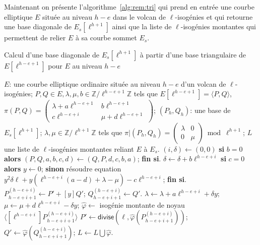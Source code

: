 \documentclass[10pt,a4paper]{book}
\theoremstyle{plain}
\theoremstyle{definition}
\theoremstyle{definition}
\theoremstyle{definition}
\theoremstyle{definition}
\theoremstyle{remark}
\theoremstyle{remark}
\theoremstyle{definition}
\begin{document}
Maintenant on présente l'algorithme~\ref{alg:rem:tri} qui prend en entrée une 
courbe elliptique $E$ située au niveau $h-e$ dans le volcan de 
$\ell$-isogénies et qui retourne une base diagonale de $E_s[\ell^{h+1}]$ ainsi 
que la liste de $\ell$-isogénies montantes qui permettent de relier $E$ à sa 
courbe sommet $E_s$.

\begin{algorithm}
\caption{\label{alg:rem:tri}Calcul d'une base diagonale de $E_s[\ell^{h+1}]$ à 
partir d'une base triangulaire de $E[\ell^{h-e+1}]$ pour $E$ au niveau
$h-e$}
\begin{algorithmic}[1]
\REQUIRE $E$: une courbe elliptique ordinaire située au niveau $h-e$ d'un 
volcan de $\ell$-isogénies; $P,Q \in E, \lambda, \mu, b \in \mathbb{Z}/
\ell^{h-e+1}\mathbb{Z}$ tels que $E[\ell^{h-e+1}]=\langle P,Q \rangle$, $\pi(P,Q)
=\left( \begin{smallmatrix}
\lambda + a \ell^{h-e+1}  & b \ell^{h-e+1} \\
c\ell^{h-e+i} & \mu + d \ell^{h-e+1}  \end{smallmatrix} \right)$;
\ENSURE $(P_h, Q_h)$: une base de $E_s[\ell^{h+1}]$;
$\lambda, \mu \in \mathbb{Z}/\ell^{h+1} \mathbb{Z}$
tels que $\pi|(P_h,Q_h)= \left( \begin{smallmatrix}
\lambda  & 0\\
0 & \mu  \end{smallmatrix} \right) \bmod {\ell^{h+1}}$; $L$ une liste de 
$\ell$-isogénies montantes reliant $E$ à $E_s$.
\STATE $(i,\delta) \leftarrow (0,0)$
\STATE \textbf{si} $b = 0$ \textbf{alors} $(P,Q,a,b,c,d) \leftarrow (Q,P,d,c,b,a)$; \textbf{fin si}.
 \label{alg:rem:tri:trigonal:debut} %
\STATE $\delta \leftarrow \delta + b \ell^{h-e+i}$
\STATE \textbf{si} $c = 0$ \textbf{alors} $y \leftarrow 0$;
\STATE\label{alg:rem:tri:trigonal:solve1} \textbf{sinon}  résoudre equation 
 $ y^2 \delta \ell + y (\ell^{h-e+i}(a-d)+\lambda - \mu) - c\ell^{h-e+i} $; \textbf{fin  si}.
\STATE\label{alg:rem:tri:trigonal:upd-P}
  $P_{h-e+i+1}^{(h-e+i)} \leftarrow P' + [y] Q'$; $Q_{h-e+i+1}^{(h-e+i)} \leftarrow Q'$.
\STATE $\lambda \leftarrow \lambda + a \ell^{h-e+i} + \delta y$; $\mu \leftarrow \mu + d \ell^{h-e+i} -\delta y$;%
\STATE\label{alg:rem:tri:rem:iso}  $\widehat{\varphi} \leftarrow $ isogénie montante de noyau $\langle [\ell^{h-e+i}]P_{h-e+i+1}^{(h-e+i)} \rangle$
\STATE\label{alg:rem:tri:rem:divide}
  $P' \leftarrow \mathsf{divise}\left(\ell, \widehat{\varphi}\left(P_{h-e+i+1}^{(h-e+i)}\right)\right)$; $Q' \leftarrow  \widehat{\varphi}\left(Q_{h-e+i+1}^{(h-e+i)}\right)$; $L \leftarrow L \bigcup \widehat{\varphi} $.

\end{algorithmic}
\end{algorithm}
\end{document}

